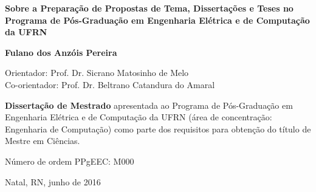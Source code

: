 \begin{titlepage}
\begin{center}
\vfill

\LARGE

\textbf{Sobre a Preparação de Propostas de Tema, Dissertações
e Teses no Programa de Pós-Graduação em Engenharia Elétrica e de Computação da UFRN}

\vfill

\Large

\textbf{Fulano dos Anzóis Pereira}

\vfill

\normalsize

Orientador: Prof. Dr. Sicrano Matosinho de Melo
\\[2ex] Co-orientador: Prof. Dr. Beltrano Catandura do Amaral

\vfill

\hfill
\parbox{0.5\linewidth}{\textbf{%
Dissertação de Mestrado}
apresentada ao Programa de Pós-Graduação em Engenharia Elétrica e de Computação da UFRN
(área de concentração: Engenharia de Computação)
como parte dos requisitos para obtenção do título de
Mestre em Ciências.}

\vfill

\large

Número de ordem PPgEEC: M000

Natal, RN, junho de 2016

\end{center}

\end{titlepage}
